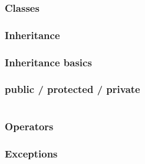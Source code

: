 \subsubsection{Classes}

\subsubsection{Inheritance}
\begin{frame}[fragile]
  \frametitle{Inheritance basics}
  \begin{cppcode}
  \end{cppcode}
\end{frame}

\begin{frame}[fragile]
  \frametitle{public / protected / private}
  \begin{verbatim}
  \end{verbatim}
\end{frame}

\subsubsection{Operators}
\subsubsection{Exceptions}
